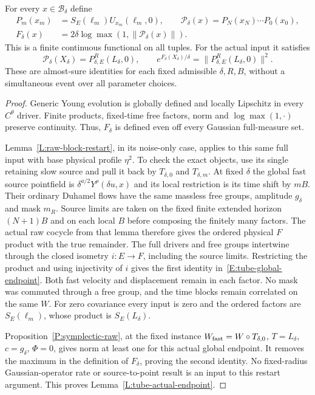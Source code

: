 \begin{lemma}\label{L:tube-actual-endpoint}
  For every $x\in\mathscr B_\delta$ define
  \[
    \begin{aligned}
      P_m(x_m)&=S_E(\ell_m)U_{x_m}(\ell_m,0),\qquad
      \mathcal P_\delta(x)=P_N(x_N)\cdots P_0(x_0),\\
      F_\delta(x)&=2\delta\log\max(1,\|\mathcal P_\delta(x)\|).
    \end{aligned}
  \]
  This is a finite continuous functional on all tuples.
  For the actual input it satisfies
  \begin{equation}\label{E:tube-global-endpoint}
    \mathcal P_\delta(X_\delta)
    =P_{\delta,E}^R(L_\delta,0),\qquad
    e^{F_\delta(X_\delta)/\delta}
    =\|P_{\delta,E}^R(L_\delta,0)\|^2 .
  \end{equation}
  These are almost-sure identities for each fixed admissible
  $\delta,R,B$, without a simultaneous event over all parameter choices.
\end{lemma}

\begin{proof}
  Generic Young evolution is globally defined and locally Lipschitz
  in every $C^\theta$ driver. Finite products, fixed-time free
  factors, norm and $\log\max(1,\cdot)$ preserve continuity.
  Thus, $F_\delta$ is defined even off every Gaussian full-measure set.

  Lemma~\ref{L:raw-block-restart}, in its noise-only case, applies
  to this same full input with base physical profile $\eta^2$.
  To check the exact objects, use its single retaining slow source
  and pull it back by $T_{\delta,0}$ and $T_{\delta,m}$.
  At fixed $\delta$ the global fast source pointfield is
  $\delta^{a/2}Y^\rho(\delta u,x)$ and its local restriction is
  its time shift by $mB$.
  Their ordinary Duhamel flows have the same massless free groups,
  amplitude $g_\delta$ and mask $m_R$.
  Source limits are taken on the fixed finite extended horizon
  $(N+1)B$ and on each local $B$ before composing the finitely
  many factors. The actual raw cocycle from that lemma therefore
  gives the ordered physical $F$ product with the true remainder.
  The full drivers and free groups intertwine through the closed
  isometry $i:E\to F$, including the source limits.
  Restricting the product and using injectivity of $i$ gives
  the first identity in~\eqref{E:tube-global-endpoint}.
  Both fast velocity and displacement remain in each factor.
  No mask was commuted through a free group, and the time blocks
  remain correlated on the same $W$.
  For zero covariance every input is zero and the ordered factors
  are $S_E(\ell_m)$, whose product is $S_E(L_\delta)$.

  Proposition~\ref{P:symplectic-raw}, at the fixed instance
  $W_{\rm fast}=W\circ T_{\delta,0}$, $T=L_\delta$,
  $c=g_\delta$, $\Phi=0$, gives norm at least one for this
  actual global endpoint. It removes the maximum in the
  definition of $F_\delta$, proving the second identity.
  No fixed-radius Gaussian-operator rate or source-to-point result
  is an input to this restart argument.
  This proves Lemma~\ref{L:tube-actual-endpoint}.
\end{proof}

